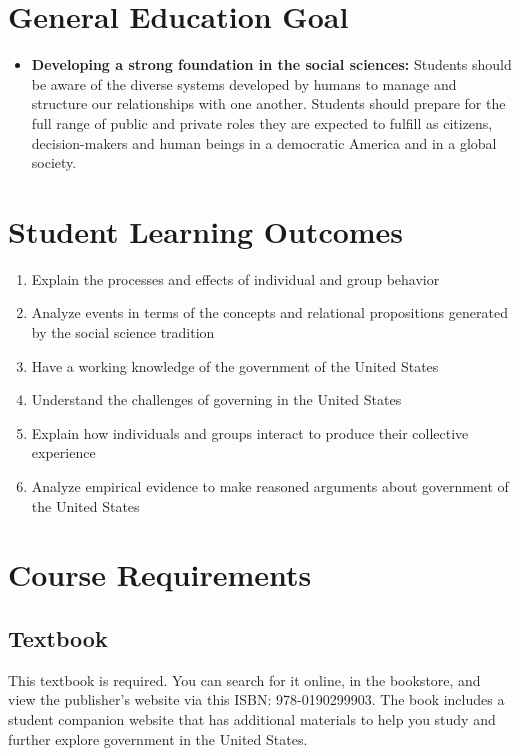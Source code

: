 \documentclass[11pt]{article}
\begin{document}
\section*{\textcolor{customred}{\bfseries General Education Goal}}

\begin{itemize}
  \item \textbf{Developing a strong foundation in the social sciences:} Students should be aware of the diverse systems developed by humans to manage and structure our relationships with one another. Students should prepare for the full range of public and private roles they are expected to fulfill as citizens, decision-makers and human beings in a democratic America and in a global society.
\end{itemize}

\section*{\textcolor{customred}{\bfseries Student Learning Outcomes}}
\begin{enumerate}
  \item Explain the processes and effects of individual and group behavior
  \item Analyze events in terms of the concepts and relational propositions generated by the social science tradition
  \item Have a working knowledge of the government of the United States
  \item Understand the challenges of governing in the United States
  \item Explain how individuals and groups interact to produce their collective experience
  \item Analyze empirical evidence to make reasoned arguments about government of the United States
\end{enumerate}

\clearpage

\section*{\textcolor{customred}{\bfseries Course Requirements}}
\subsection*{\textcolor{customred}{\bfseries Textbook}}
This textbook is required. You can search for it online, in the bookstore, and view the publisher's website via this ISBN: 978-0190299903. The book includes a student companion website that has additional materials to help you study and further explore government in the United States.
\end{document}
